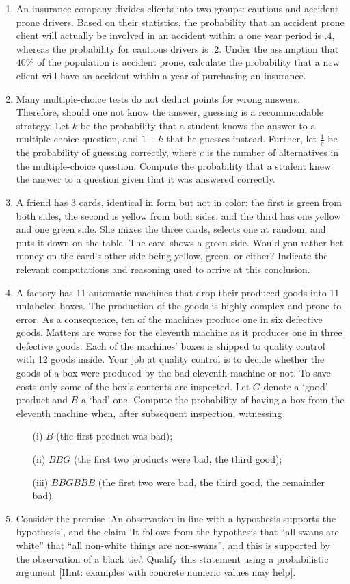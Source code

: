 \documentclass{article}
\begin{document}
\begin{enumerate}
	\item An insurance company divides clients into two groups: cautious and accident prone drivers. Based on their statistics, the probability that an accident prone client will actually be involved in an accident within a one year period is $.4$, whereas the probability for cautious drivers is $.2$. Under the assumption that $40\%$ of the population is accident prone, calculate the probability that a new client will have an accident within a year of purchasing an insurance.
	\item Many multiple-choice tests do not deduct points for wrong answers. Therefore, should one not know the answer, guessing is a recommendable strategy. Let $k$ be the probability that a student knows the answer to a multiple-choice question, and $1-k$ that he guesses instead. Further, let $\frac{1}{c}$ be the probability of guessing correctly, where $c$ is the number of alternatives in the multiple-choice question. Compute the probability that a student knew the answer to a question given that it was answered correctly.
	\item A friend has 3 cards, identical in form but not in color: the first is green from both sides, the second is yellow from both sides, and the third has one yellow and one green side. She mixes the three cards, selects one at random, and puts it down on the table. The card shows a green side. Would you rather bet money on the card's other side being yellow, green, or either? Indicate the relevant computations and reasoning used to arrive at this conclusion.
	\item A factory has 11 automatic machines that drop their produced goods into 11 unlabeled boxes. The production of the goods is highly complex and prone to error. As a consequence, ten of the machines produce one in six defective goods. Matters are worse for the eleventh machine as it produces one in three defective goods. Each of the machines' boxes is shipped to quality control with 12 goods inside. Your job at quality control is to decide whether the goods of a box were produced by the bad eleventh machine or not. To save costs only some of the box's contents are inspected. Let $G$ denote a `good' product and $B$ a `bad' one. Compute the probability of having a box from the eleventh machine when, after subsequent inspection, witnessing
		\begin{itemize}
			\item[(i)] $B$ (the first product was bad);
			\item[(ii)] $BBG$ (the first two products were bad, the third good);
			\item[(iii)] $BBGBBB$ (the first two were bad, the third good, the remainder bad).
		\end{itemize}
	\item Consider the premise `An observation in line with a hypothesis supports the hypothesis', and the claim `It follows from the hypothesis that ``all swans are white'' that ``all non-white things are non-swans'', and this is supported by the observation of a black tie.'. Qualify this statement using a probabilistic argument [Hint: examples with concrete numeric values may help].
      

\end{enumerate}
\end{document}
